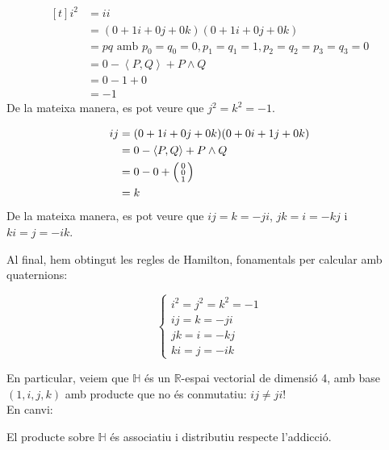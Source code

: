 \documentclass[../main.tex]{subfiles}
\begin{document}
	\begin{obs}
		\begin{displaymath}
			\begin{aligned}[t]
				i^2 &= ii\\
					&= (0 + 1i + 0j + 0k) (0 + 1i + 0j + 0k)\\
					&= pq \text{ amb } p_0 = q_0 = 0, p_1 = q_1 = 1, p_2 = q_2 = p_3 = q_3 = 0\\
					&= 0 - \left\langle P, Q\right\rangle + P \wedge Q\\
					&= 0 - 1 + 0\\
					&= -1
			\end{aligned}
		\end{displaymath}
		De la mateixa manera, es pot veure que $j^2 = k^2 = -1$.
	\end{obs}

	\begin{obs}
		\begin{displaymath}
			\begin{aligned}[t]
				ij &= (0 + 1i + 0j + 0k)(0 + 0i + 1j + 0k)\\
				   &= 0 - \left\langle P, Q\right\rangle + P \wedge Q\\
				   &= 0 - 0 + \begin{psmallmatrix}
							0\\0\\1
							\end{psmallmatrix}\\
				   &= k
			\end{aligned}
		\end{displaymath}
		De la mateixa manera, es pot veure que $ij = k = -ji$, $jk = i = -kj$ i $ki = j = -ik$.
	\end{obs}

	Al final, hem obtingut les regles de Hamilton, fonamentals per calcular amb quaternions:

	\begin{displaymath}
		\begin{cases}
			i^2 = j^2 = k^2 = -1\\
			ij = k = -ji\\
			jk = i = -kj\\
			ki = j = -ik
		\end{cases}
	\end{displaymath}

	En particular, veiem que $\mathbb{H}$ és un $\mathbb{R}$-espai vectorial de dimensió 4, amb base $(1, i, j, k)$ amb producte que no és conmutatiu: $ij \neq ji$!\\
	En canvi:
	\begin{proposicio}
		El producte sobre $\mathbb{H}$ és associatiu i distributiu respecte l'addicció.
	\end{proposicio}
\end{document}
